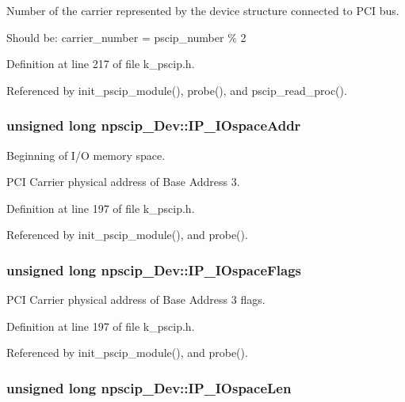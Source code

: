 Number of the carrier represented by the device structure connected to PCI bus. 

Should be: carrier\_\-number = pscip\_\-number \% 2 

Definition at line 217 of file k\_\-pscip.h.

Referenced by init\_\-pscip\_\-module(), probe(), and pscip\_\-read\_\-proc().\hypertarget{structnpscip___dev_6e53454785de7b34c1cff8030768df82}{
\subsubsection[{IP\_\-IOspaceAddr}]{\setlength{\rightskip}{0pt plus 5cm}unsigned long {\bf npscip\_\-Dev::IP\_\-IOspaceAddr}}}
\label{structnpscip___dev_6e53454785de7b34c1cff8030768df82}


Beginning of I/O memory space. 

PCI Carrier physical address of Base Address 3. 

Definition at line 197 of file k\_\-pscip.h.

Referenced by init\_\-pscip\_\-module(), and probe().\hypertarget{structnpscip___dev_8dfde8b4c64adcd6c7f67d64dfa2c4eb}{
\subsubsection[{IP\_\-IOspaceFlags}]{\setlength{\rightskip}{0pt plus 5cm}unsigned long {\bf npscip\_\-Dev::IP\_\-IOspaceFlags}}}
\label{structnpscip___dev_8dfde8b4c64adcd6c7f67d64dfa2c4eb}


PCI Carrier physical address of Base Address 3 flags. 



Definition at line 197 of file k\_\-pscip.h.

Referenced by init\_\-pscip\_\-module(), and probe().\hypertarget{structnpscip___dev_8f1859f1a65f449d6c9fde8a226009a2}{
\subsubsection[{IP\_\-IOspaceLen}]{\setlength{\rightskip}{0pt plus 5cm}unsigned long {\bf npscip\_\-Dev::IP\_\-IOspaceLen}}}
\label{structnpscip___dev_8f1859f1a65f449d6c9fde8a226009a2}


